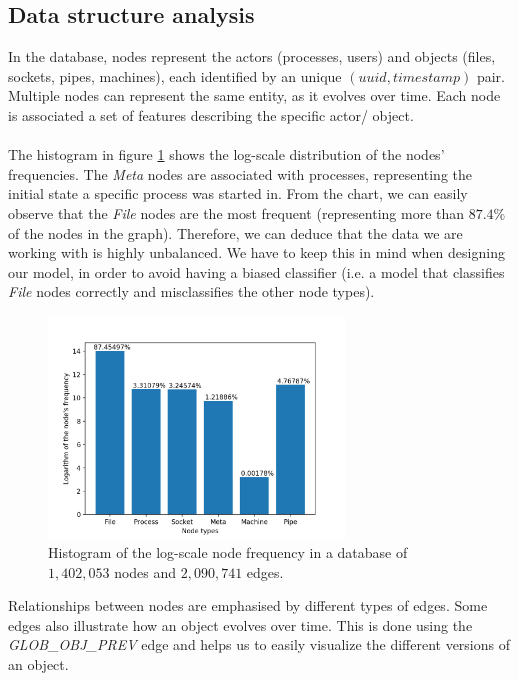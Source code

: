 	\subsection{Data structure analysis} \label{Section: prep/datastructure}
	In the database, nodes represent the actors (processes, users) and objects (files, sockets, pipes, machines), each identified by an unique $(uuid, timestamp)$ pair. Multiple nodes can represent the same entity, as it evolves over time. Each node is associated a set of features describing the specific actor/ object. 
	\\ \\
	The histogram in figure \ref{Figure 2.1.1} shows the log-scale distribution of the nodes' frequencies. The \textit{Meta} nodes are associated with processes, representing the initial state a specific process was started in. From the chart, we can easily observe that the \textit{File} nodes are the most frequent (representing more than $87.4\%$ of the nodes in the graph). Therefore, we can deduce that the data we are working with is highly unbalanced. We have to keep this in mind when designing our model, in order to avoid having a biased classifier (i.e. a model that classifies \textit{File} nodes correctly and misclassifies the other node types). 
	\begin{figure}[H]
		\centering

		\includegraphics[width=0.7\textwidth]{graphics/node-freq-graph}
		\caption[\textbf{Log-scale node frequency}]{
			Histogram of the log-scale node frequency in a database of $1,402,053$ nodes and $2,090,741$ edges. 
		}
		\label{Figure 2.1.1}
	\end{figure}
	Relationships between nodes are emphasised by different types of edges. Some edges also illustrate how an object evolves over time. This is done using the \textit{GLOB\_OBJ\_PREV} edge and helps us to easily visualize the different versions of an object.
